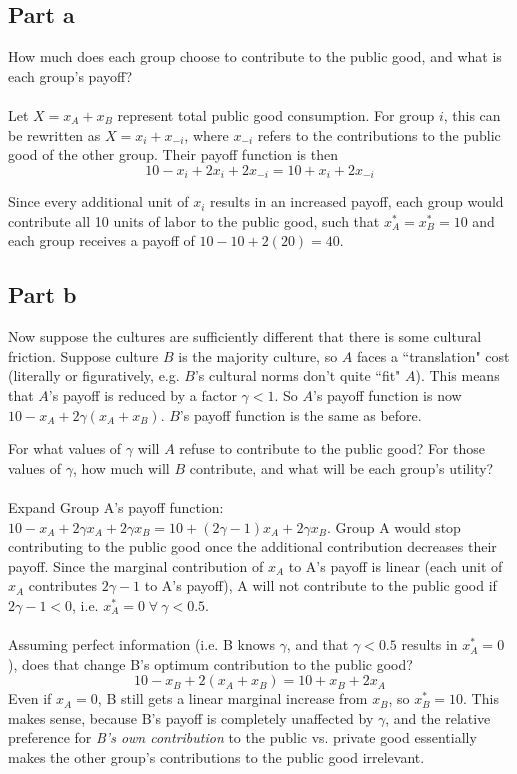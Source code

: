 \documentclass[10pt]{article}
\begin{document}
\subsection*{Part a} How much does each group choose to contribute to the public good, and what is each group's payoff?
\\ \\
Let $X = x_A + x_B$ represent total public good consumption. For group $i$, this can be rewritten as $X=x_i + x_{-i}$, where $x_{-i}$ refers to the contributions to the public good of the other group. Their payoff function is then
\[
10 - x_i + 2x_i + 2x_{-i} = 10 + x_i + 2x_{-i}
\]

Since every additional unit of $x_i$ results in an increased payoff, each group would contribute all 10 units of labor to the public good, such that $x_A^* = x_B^* = 10$ and each group receives a payoff of $10 - 10 + 2(20) = 40$. 
\newpage

\subsection*{Part b} Now suppose the cultures are sufficiently different that there is some cultural friction. Suppose culture $B$ is the majority culture, so $A$ faces a ``translation" cost (literally or figuratively, e.g. $B$'s cultural norms don't quite ``fit" $A$). This means that $A$'s payoff is reduced by a factor $\gamma<1$. So $A$'s payoff function is now $10-x_A+2\gamma(x_A+x_B)$. $B$'s payoff function is the same as before.

For what values of $\gamma$ will $A$ refuse to contribute to the public good? For those values of $\gamma$, how much will $B$ contribute, and what will be each group's utility?
\\ \\
Expand Group A's payoff function: $10 - x_A + 2\gamma x_A + 2\gamma x_B = 10 + (2\gamma - 1)x_A + 2\gamma x_B$. Group A would stop contributing to the public good once the additional contribution decreases their payoff. Since the marginal contribution of $x_A$ to A's payoff is linear (each unit of $x_A$ contributes $2\gamma - 1$ to A's payoff), A will not contribute to the public good if $2\gamma - 1 < 0$, i.e. $x_A^* = 0 \; \forall \: \gamma < 0.5$.
\\ \\
Assuming perfect information (i.e. B knows $\gamma$, and that $\gamma < 0.5$ results in $x_A^* = 0$), does that change B's optimum contribution to the public good?
\[
10 - x_B + 2(x_A + x_B) = 10 + x_B + 2x_A
\]
Even if $x_A = 0$, B still gets a linear marginal increase from $x_B$, so $x_B^* = 10$. This makes sense, because B's payoff is completely unaffected by $\gamma$, and the relative preference for \emph{B's own contribution} to the public vs. private good essentially makes the other group's contributions to the public good irrelevant.
\end{document}
